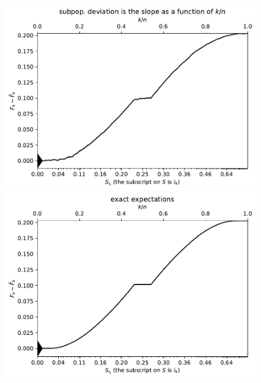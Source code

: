 \documentclass{article}
\begin{document}
\begin{figure}
\begin{centering}

\parbox{\imsize}{\includegraphics[width=\imsize]
                {./codes/unweighted/50000_5000_10_0/cumulative.pdf}}
\quad\quad
\parbox{\imsize}{\includegraphics[width=\imsize]
                {./codes/unweighted/50000_5000_10_0/cumulative_exact.pdf}}

\vspace{\vertsep}


\end{centering}
\end{figure}
\end{document}
